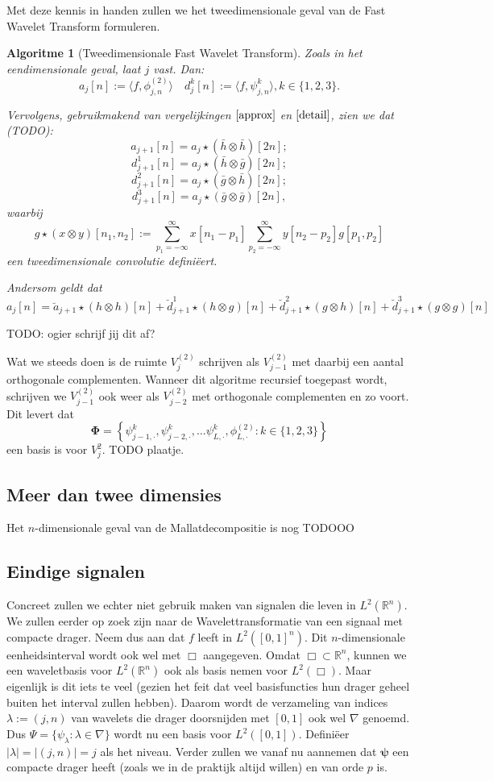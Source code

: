 \documentclass[11pt]{report}
\newcommand{\R}{\mathbb{R}}
\theoremstyle{plain}
\newtheorem*{algo}{Algoritme}
\theoremstyle{remark}
\begin{document}
Met deze kennis in handen zullen we het tweedimensionale geval van de Fast Wavelet Transform formuleren.
\begin{algo}[Tweedimensionale Fast Wavelet Transform]
Zoals in het eendimensionale geval, laat $j$ vast. Dan:
\[
	a_j[n] := \langle f, \phi^{(2)}_{j,n} \rangle \quad d^k_j[n] := \langle f, \psi^k_{j,n} \rangle , k \in \{1,2,3\}.
\]

Vervolgens, gebruikmakend van vergelijkingen $\ref{approx}$ en $\ref{detail}$, zien we dat (TODO):
\[
	a_{j+1}[n] = a_j \star (\bar{h} \otimes \bar{h})[2n];
\]
\[
	d^1_{j+1}[n] = a_j \star (\bar{h} \otimes \bar{g})[2n];
\]
\[
	d^2_{j+1}[n] = a_j \star (\bar{g} \otimes \bar{h})[2n];
\]
\[
	d^3_{j+1}[n] = a_j \star (\bar{g} \otimes \bar{g})[2n],
\]
waarbij
\[
	g \star (x \otimes y)[n_1,n_2] := \sum_{p_1=-\infty}^\infty x[n_1 - p_1] \sum_{p_2 = -\infty}^\infty y[n_2 - p_2] g[p_1, p_2]
\]
een tweedimensionale convolutie defini\"eert.

Andersom geldt dat
\[
a_j[n] = \breve{a}_{j+1} \star (h \otimes h)[n] + \breve{d}_{j+1}^1 \star (h \otimes g)[n] + \breve{d}_{j+1}^2 \star (g \otimes h)[n] + \breve{d}_{j+1}^3 \star (g \otimes g)[n]
\]
\end{algo}

TODO: ogier schrijf jij dit af?

Wat we steeds doen is de ruimte $V_j^{(2)}$ schrijven als $V_{j-1}^{(2)}$ met daarbij een aantal orthogonale complementen. Wanneer dit algoritme recursief toegepast wordt, schrijven we $V_{j-1}^{(2)}$ ook weer als $V_{j-2}^{(2)}$ met orthogonale complementen en zo voort. Dit levert dat
\[
	\boldsymbol\Phi = \left\{ \psi^k_{j-1,\cdot}, \psi^k_{j-2,\cdot}, \ldots \psi^k_{L,\cdot}, \phi^{(2)}_{L,\cdot}: k \in \{1,2,3\} \right\}
\]
een basis is voor $V_j^2$. TODO plaatje.

\subsection{Meer dan twee dimensies}
Het $n$-dimensionale geval van de Mallatdecompositie is nog TODOOO

\subsection{Eindige signalen}
Concreet zullen we echter niet gebruik maken van signalen die leven in $L^2(\R^n)$. We zullen eerder op zoek zijn naar de Wavelettransformatie van een signaal met compacte drager. Neem dus aan dat $f$ leeft in $L^2([0,1]^n)$. Dit $n$-dimensionale eenheidsinterval wordt ook wel met $\Box$ aangegeven. Omdat $\Box \subset \R^n$, kunnen we een waveletbasis voor $L^2(\R^n)$ ook als basis nemen voor $L^2(\Box)$. Maar eigenlijk is dit iets te veel (gezien het feit dat veel basisfuncties hun drager geheel buiten het interval zullen hebben). Daarom wordt de verzameling van indices $\lambda := (j,n)$ van wavelets die drager doorsnijden met $[0,1]$ ook wel $\nabla$ genoemd. Dus $\Psi = \{ \psi_\lambda: \lambda \in \nabla \}$ wordt nu een basis voor $L^2([0,1])$. Defini\"eer $|\lambda| = |(j,n)| = j$ als het niveau.
Verder zullen we vanaf nu aannemen dat $\boldsymbol\psi$ een compacte drager heeft (zoals we in de praktijk altijd willen) en van orde $p$ is.
\end{document}

